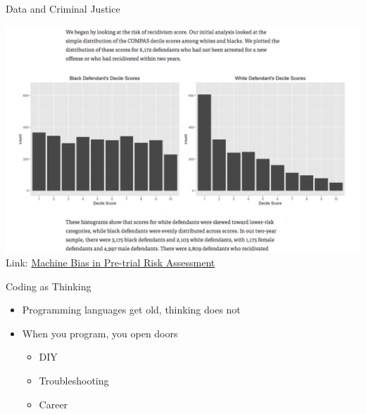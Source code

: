 \documentclass{beamer}
\begin{document}
\begin{frame}{Data and Criminal Justice}
 \begin{center}
   \includegraphics[width=\textwidth]{img/propublica.png}
   \\
   Link: \href{https://www.propublica.org/article/machine-bias-risk-assessments-in-criminal-sentencing}{Machine Bias in Pre-trial Risk Assessment}
 \end{center}
\end{frame}

\begin{frame}{Coding as Thinking}
    \begin{itemize}
        \item Programming languages get old, thinking does not
        \item When you program, you open doors
        \begin{itemize}
          \item DIY
          \item Troubleshooting
          \item Career
        \end{itemize}
    \end{itemize}
\end{frame}
\end{document}
